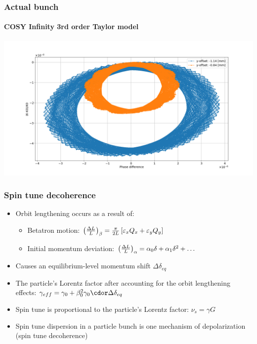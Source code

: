 \documentclass{beamer}
\begin{document}
\begin{frame}\frametitle{Actual bunch} \framesubtitle{COSY Infinity 3rd order Taylor model}
  \centering
  \includegraphics[width=\linewidth]{psp_diagram_betatron}
\end{frame}

\begin{frame}\frametitle{Spin tune decoherence}
  \begin{itemize}
  \item Orbit lengthening occurs as a result of:
    \begin{itemize}
    \item Betatron motion: $\bkt{\frac{\Delta L}{L}}_\beta = \frac{\pi}{2L}\bkt*{\varepsilon_xQ_x + \varepsilon_yQ_y}$
    \item Initial momentum deviation: $\bkt{\frac{\Delta L}{L}}_\alpha = \alpha_0\delta + \alpha_1\delta^2 + \dots$
    \end{itemize}
  \item Causes an equilibrium-level momentum shift $\Delta\delta_{eq}$
  \item The particle's Lorentz factor after accounting for the orbit lengthening effects: $\gamma_{eff} = \gamma_0 + \beta_0^2\gamma_0\cdor \Delta\delta_{eq}$
  \item Spin tune is proportional to the particle's Lorentz factor: $\nu_s = \gamma G$
  \item Spin tune dispersion in a particle bunch is one mechanism of depolarization (spin tune decoherence)
  \end{itemize}
\end{frame}
\end{document}
